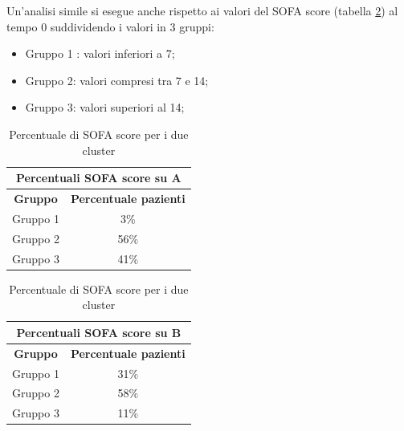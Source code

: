 Un'analisi simile si esegue anche rispetto ai valori del SOFA score (tabella \ref{table:cluster2}) al tempo 0 suddividendo i valori in 3 gruppi: 
\begin{itemize}
	\item Gruppo 1 : valori inferiori a 7;
	\item Gruppo 2: valori compresi tra 7 e 14;
	\item Gruppo 3: valori superiori al 14;
\end{itemize}

\begin{table}[h!]
	
	\parbox{.50\textwidth}{
		\centering
		\begin{tabular}{ |c| c|} 
			\hline
			\multicolumn{2}{|c|}{Percentuali SOFA score su A} \\
			\hline
			\textbf{Gruppo} & \textbf{Percentuale pazienti}\\
			\hline
			\hline
			Gruppo 1 & 3\% \\
			\hline
			Gruppo 2& 56\%  \\
			\hline 
			Gruppo 3 & 41\% \\
			\hline
	\end{tabular}}
	\quad
	\parbox{.50\textwidth}{
		\centering
		\begin{tabular}{ |c| c|} 
			\hline
			\multicolumn{2}{|c|}{Percentuali SOFA score su B}  \\
			\hline
			\textbf{Gruppo} & \textbf{Percentuale pazienti} \\
			\hline
			\hline
			Gruppo 1 & 31\% \\
			\hline
			Gruppo 2& 58\%  \\
			\hline 
			Gruppo 3 & 11\% \\
			\hline
	\end{tabular}}
	\caption{Percentuale di SOFA score per i due cluster}
	\label{table:cluster2}
\end{table}